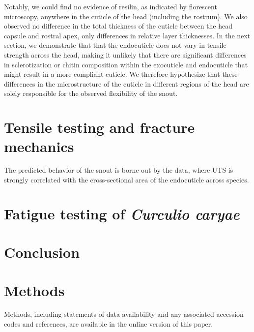 \documentclass[twocolumn, linenumbers, superscriptaddress]{revtex4-1}
\begin{document}
		Notably, we could find no evidence of resilin, as indicated by florescent microscopy, anywhere in the cuticle of the head (including the rostrum).
		We also observed no difference in the total thickness of the cuticle between the head capsule and rostral apex, only differences in relative layer thicknesses.
		In the next section, we demonstrate that that the endocuticle does not vary in tensile strength across the head, making it unlikely that there are significant differences in sclerotization or chitin composition within the exocuticle and endocuticle that might result in a more compliant cuticle.
		We therefore hypothesize that these differences in the microstructure of the cuticle in different regions of the head are solely responsible for the observed flexibility of the snout.
	
	\section{Tensile testing and fracture mechanics} %
		The predicted behavior of the snout is borne out by the data, where UTS is strongly correlated with the cross-sectional area of the endocuticle across species.
		
	\section{Fatigue testing of \textit{Curculio caryae}} %

	\section{Conclusion} %

	\section{Methods}
		Methods, including statements of data availability and any associated accession codes and references, are available in the online version of this paper.
	
\end{document}
